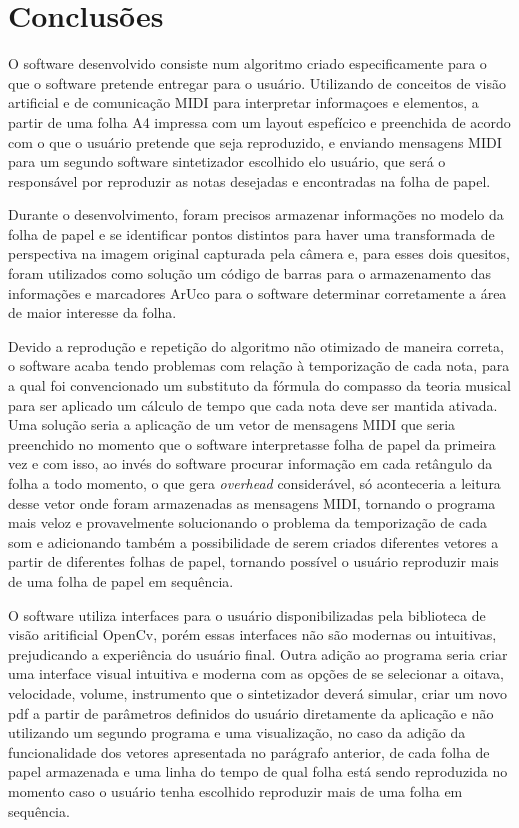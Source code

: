 \documentclass[12pt]{report}
\begin{document}
\chapter{Conclusões}
\label{cha:conclusoes}

O software desenvolvido consiste num algoritmo criado especificamente para o que o software pretende entregar para o usuário. Utilizando de conceitos de visão artificial e de comunicação MIDI para interpretar informaçoes e elementos, a partir de uma folha A4 impressa com um layout espefícico e preenchida de acordo com o que o usuário pretende que seja reproduzido, e enviando mensagens MIDI para um segundo software sintetizador escolhido elo usuário, que será o responsável por reproduzir as notas desejadas e encontradas na folha de papel.

Durante o desenvolvimento, foram precisos armazenar informações no modelo da folha de papel e se identificar pontos distintos para haver uma transformada de perspectiva na imagem original capturada pela câmera e, para esses dois quesitos, foram utilizados como solução um código de barras para o armazenamento das informações e marcadores ArUco para o software determinar corretamente a área de maior interesse da folha.

Devido a reprodução e repetição do algoritmo não otimizado de maneira correta, o software acaba tendo problemas com relação à temporização de cada nota, para a qual foi convencionado um substituto da fórmula do compasso da teoria musical para ser aplicado um cálculo de tempo que cada nota deve ser mantida ativada. Uma solução seria a aplicação de um vetor de mensagens MIDI que seria preenchido no momento que o software interpretasse folha de papel da primeira vez e com isso, ao invés do software procurar informação em cada retângulo da folha a todo momento, o que gera {\it overhead} considerável, só aconteceria a leitura desse vetor onde foram armazenadas as mensagens MIDI, tornando o programa mais veloz e provavelmente solucionando o problema da temporização de cada som e adicionando também a possibilidade de serem criados diferentes vetores a partir de diferentes folhas de papel, tornando possível o usuário reproduzir mais de uma folha de papel em sequência.

O software utiliza interfaces para o usuário disponibilizadas pela biblioteca de visão aritificial OpenCv, porém essas interfaces não são modernas ou intuitivas, prejudicando a experiência do usuário final. Outra adição ao programa seria criar uma interface visual intuitiva e moderna com as opções de se selecionar a oitava, velocidade, volume, instrumento que o sintetizador deverá simular, criar um novo pdf a partir de parâmetros definidos do usuário diretamente da aplicação e não utilizando um segundo programa e uma visualização, no caso da adição da funcionalidade dos vetores apresentada no parágrafo anterior, de cada folha de papel armazenada e uma linha do tempo de qual folha está sendo reproduzida no momento caso o usuário tenha escolhido reproduzir mais de uma folha em sequência.
\end{document}
